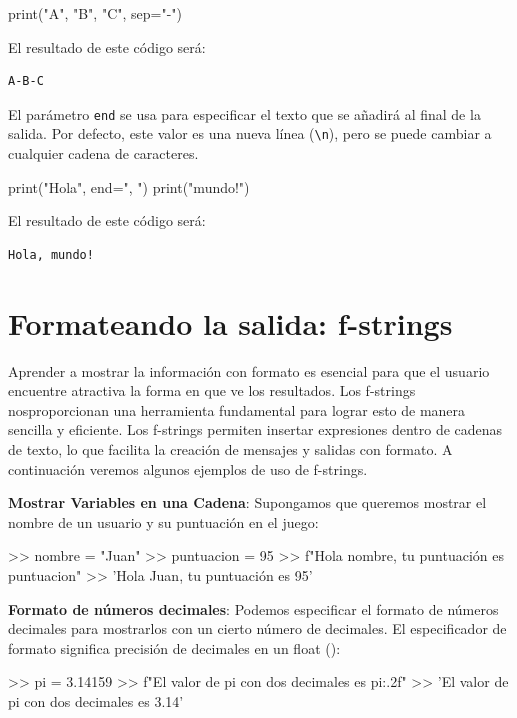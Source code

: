 \begin{python}
print("A", "B", "C", sep="-")
\end{python}

El resultado de este código será:
\begin{Verbatim}[frame=single]
A-B-C
\end{Verbatim}


El parámetro \verb|end| se usa para especificar el texto que se añadirá al final de la salida. Por defecto, este valor es una nueva línea (\verb|\n|), pero se puede cambiar a cualquier cadena de caracteres.

\begin{python}
print("Hola", end=", ")
print("mundo!")
\end{python}

El resultado de este código será:
\begin{Verbatim}[frame=single]
Hola, mundo!
\end{Verbatim}





\section{Formateando la salida: f-strings}

Aprender a mostrar la información con formato es esencial para que el usuario encuentre atractiva la forma en que ve los resultados. Los f-strings nosproporcionan una herramienta fundamental para lograr esto de manera sencilla y eficiente. Los f-strings permiten insertar expresiones dentro de cadenas de texto, lo que facilita la creación de mensajes y salidas con formato.
%
A continuación veremos algunos ejemplos de uso de f-strings.

\noindent \textbf{Mostrar Variables en una Cadena}: Supongamos que queremos mostrar el nombre de un usuario y su puntuación en el juego:

\begin{python}
>> nombre = "Juan"
>> puntuacion = 95
>> f"Hola {nombre}, tu puntuación es {puntuacion}"
>> 'Hola Juan, tu puntuación es 95'
\end{python}

\noindent \textbf{Formato de números decimales}: Podemos especificar el formato de números decimales para mostrarlos con un cierto número de decimales. El especificador de formato  significa precisión de  decimales en un float ():
\begin{python}
>> pi = 3.14159
>> f"El valor de pi con dos decimales es {pi:.2f}"
>> 'El valor de pi con dos decimales es 3.14'
\end{python}

